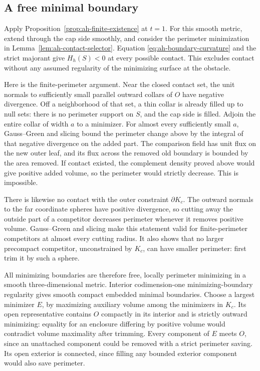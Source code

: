 \subsection{A free minimal boundary}

Apply Proposition~\ref{prop:ah-finite-existence} at \(t=1\).
For this smooth metric, extend through the cap side
smoothly, and consider the perimeter minimization in
Lemma~\ref{lem:ah-contact-selector}.  Equation
\eqref{eq:ah-boundary-curvature} and the strict majorant
give \(H_h(S)<0\) at every possible contact.
This excludes contact without any assumed regularity
of the minimizing surface at the obstacle.

Here is the finite-perimeter argument.  Near the closed
contact set, the unit normals to sufficiently small
parallel outward collars of \(O\) have negative
divergence.  Off a neighborhood of that set, a thin
collar is already filled up to null sets: there is no
perimeter support on \(S\), and the cap side is filled.
Adjoin the entire collar of width \(a\) to a minimizer.
For almost every sufficiently small \(a\), Gauss--Green
and slicing bound the perimeter change above by the
integral of that negative divergence on the added part.
The comparison field has unit flux on the new outer
leaf, and its flux across the removed old boundary is
bounded by the area removed.  If contact existed,
the complement density proved above would give
positive added volume, so the perimeter would strictly
decrease.  This is impossible.

There is likewise no contact with the outer constraint
\(\partial K_c\).  The outward normals to the far
coordinate spheres have positive divergence, so
cutting away the outside part of a competitor decreases
perimeter whenever it removes positive volume.
Gauss--Green and slicing make this statement valid
for finite-perimeter competitors at almost every
cutting radius.  It also shows that no larger precompact
competitor, unconstrained by \(K_c\), can have smaller
perimeter: first trim it by such a sphere.

All minimizing boundaries are therefore free, locally
perimeter minimizing in a smooth three-dimensional
metric.  Interior codimension-one minimizing-boundary
regularity gives smooth compact embedded minimal
boundaries.  Choose a largest minimizer \(E\), by
maximizing auxiliary volume among the minimizers in
\(K_c\).  Its open representative contains \(O\)
compactly in its interior and is strictly outward
minimizing: equality for an enclosure differing by
positive volume would
contradict volume maximality after trimming.
Every component of \(E\) meets \(O\), since an
unattached component could be removed with a strict
perimeter saving.  Its open exterior is connected,
since filling any bounded exterior component would
also save perimeter.

